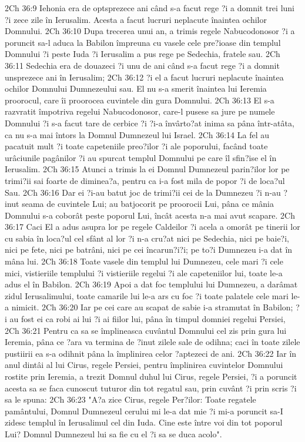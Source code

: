 2Ch 36:9  Iehonia era de optsprezece ani când s-a facut rege ?i a domnit trei luni ?i zece zile în Ierusalim. Acesta a facut lucruri neplacute înaintea ochilor Domnului.
2Ch 36:10  Dupa trecerea unui an, a trimis regele Nabucodonosor ?i a poruncit sa-l aduca la Babilon împreuna cu vasele cele pre?ioase din templul Domnului ?i peste Iuda ?i Ierusalim a pus rege pe Sedechia, fratele sau.
2Ch 36:11  Sedechia era de douazeci ?i unu de ani când s-a facut rege ?i a domnit unsprezece ani în Ierusalim;
2Ch 36:12  ?i el a facut lucruri neplacute înaintea ochilor Domnului Dumnezeului sau. El nu s-a smerit înaintea lui Ieremia proorocul, care îi proorocea cuvintele din gura Domnului.
2Ch 36:13  El s-a razvratit împotriva regelui Nabucodonosor, care-l pusese sa jure pe numele Domnului ?i s-a facut tare de cerbice ?i ?i-a învârto?at inima sa pâna într-atâta, ca nu s-a mai întors la Domnul Dumnezeul lui Israel.
2Ch 36:14  La fel au pacatuit mult ?i toate capeteniile preo?ilor ?i ale poporului, facând toate urâciunile pagânilor ?i au spurcat templul Domnului pe care îl sfin?ise el în Ierusalim.
2Ch 36:15  Atunci a trimis la ei Domnul Dumnezeul parin?ilor lor pe trimi?ii sai foarte de diminea?a, pentru ca i-a fost mila de popor ?i de loca?ul Sau.
2Ch 36:16  Dar ei ?i-au batut joc de trimi?ii cei de la Dumnezeu ?i n-au ?inut seama de cuvintele Lui; au batjocorit pe proorocii Lui, pâna ce mânia Domnului s-a coborât peste poporul Lui, încât acesta n-a mai avut scapare.
2Ch 36:17  Caci El a adus asupra lor pe regele Caldeilor ?i acela a omorât pe tinerii lor cu sabia în loca?ul cel sfânt al lor ?i n-a cru?at nici pe Sedechia, nici pe baie?i, nici pe fete, nici pe batrâni, nici pe cei încarun?i?i; pe to?i Dumnezeu i-a dat în mâna lui.
2Ch 36:18  Toate vasele din templul lui Dumnezeu, cele mari ?i cele mici, vistieriile templului ?i vistieriile regelui ?i ale capeteniilor lui, toate le-a adus el în Babilon.
2Ch 36:19  Apoi a dat foc templului lui Dumnezeu, a darâmat zidul Ierusalimului, toate camarile lui le-a ars cu foc ?i toate palatele cele mari le-a nimicit.
2Ch 36:20  Iar pe cei care au scapat de sabie i-a stramutat în Babilon; ?i au fost ei ca robi ai lui ?i ai fiilor lui, pâna în timpul domniei regelui Persiei,
2Ch 36:21  Pentru ca sa se împlineasca cuvântul Domnului cel zis prin gura lui Ieremia, pâna ce ?ara va termina de ?inut zilele sale de odihna; caci în toate zilele pustiirii ea s-a odihnit pâna la împlinirea celor ?aptezeci de ani.
2Ch 36:22  Iar în anul dintâi al lui Cirus, regele Persiei, pentru împlinirea cuvintelor Domnului rostite prin Ieremia, a trezit Domnul duhul lui Cirus, regele Persiei, ?i a poruncit acesta sa se faca cunoscut tuturor din tot regatul sau, prin cuvânt ?i prin scris ?i sa le spuna:
2Ch 36:23  "A?a zice Cirus, regele Per?ilor: Toate regatele pamântului, Domnul Dumnezeul cerului mi le-a dat mie ?i mi-a poruncit sa-I zidesc templul în Ierusalimul cel din Iuda. Cine este între voi din tot poporul Lui? Domnul Dumnezeul lui sa fie cu el ?i sa se duca acolo".


